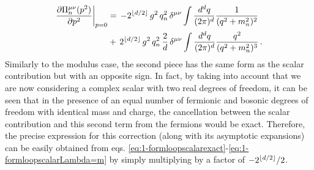%
\begin{equation}\label{eq:1formfermionloopcompleteexpression}
\begin{aligned}
	\frac{\partial \Pi^{\mu \nu}_n(p^2)}{\partial p^2} \bigg\rvert_{p=0}  &= \, -2^{\lfloor d/2 \rfloor}\, g^2\,  q_n^2 \, \delta^{\mu\nu}  \int \dfrac{d^d q}{(2\pi)^d} \dfrac{1}{(q^2+m_n^2)^2}\\
    &+ \,  2^{\lfloor d/2 \rfloor}\,  g^2\,  q_n^2\,   \frac{2}{d} \, \delta^{\mu\nu}  \int \dfrac{d^d q}{(2\pi)^d} \dfrac{q^2}{(q^2+m_n^2)^3}\, .    
\end{aligned}
\end{equation}
%
Similarly to the modulus case, the second piece has the same form as the scalar contribution but with an opposite sign. In fact, by taking into account that we are now considering a complex scalar with two real degrees of freedom, it can be seen that in the presence of an equal number of fermionic and bosonic degrees of freedom with identical mass and charge, the cancellation between the scalar contribution and this second term from the fermions would be exact. Therefore, the precise expression for this correction (along with its asymptotic expansions) can be easily obtained from eqs. \eqref{eq:1-formloopscalarexact}-\eqref{eq:1-formloopscalarLambda=m} by simply multiplying by a factor of $-2^{\lfloor d/2 \rfloor}/2$.
		
